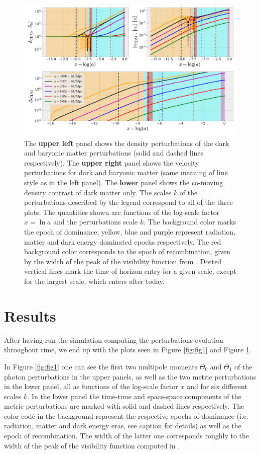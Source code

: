 \documentclass[twocolumn]{aastex62}
\begin{document}
\begin{figure}
    \includegraphics[scale = 0.65]{Figures/fig2.pdf}
    \caption{The \textbf{upper left} panel shows the density perturbations of the dark and baryonic matter perturbations (solid and dashed lines respectively). The \textbf{upper right} panel shows the velocity perturbations for dark and baryonic matter (same meaning of line style as in the left panel). The \textbf{lower} panel shows the co-moving density contrast of dark matter only. The scales $k$ of the perturbations described by the legend correspond to all of the three plots. The quantities shown are functions of the log-scale factor $x = \ln a$ and the perturbations scale $k$.  The background color marks the epoch of dominance; yellow, blue and purple represent radiation, matter and dark energy dominated epochs respectively. The red background color corresponds to the epoch of recombination, given by the width of the peak of the visibility function from \cite{stutzer:2020b}. Dotted vertical lines mark the time of horizon entry for a given scale, except for the largest scale, which enters after today.}
    \label{fig:fig2}
\end{figure}

\section{Results}\label{sec:Results}

After having run the simulation computing the perturbations evolution throughout time, we end up with the plots seen in Figure \ref{fig:fig1} and Figure \ref{fig:fig2}.

In Figure \ref{fig:fig1} one can see the first two multipole moments $\Theta_0$ and $\Theta_1$ of the photon perturbations in the upper panels, as well as the two metric perturbations in the lower panel, all as functions of the log-scale factor $x$ and for six different scales $k$. In the lower panel the time-time and space-space components of the metric perturbations are marked with solid and dashed lines respectively. The color code in the background represent the respective epochs of dominance (i.e. radiation, matter and dark energy eras, see caption for details) as well as the epoch of recombination. The width of the latter one corresponds roughly to the width of the peak of the visibility function computed in \cite{stutzer:2020b}. 
\end{document}
